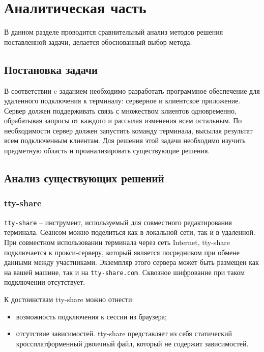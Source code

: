 \chapter{Аналитическая часть}

В данном разделе проводится сравнительный анализ методов решения
поставленной задачи, делается обоснованный выбор метода.

\section{Постановка задачи}

В соответствии c заданием необходимо разработать программное обеспечение для удаленного подключения к терминалу: серверное и клиентское приложение. Сервер должен поддерживать связь с множеством клиентов одновременно, обрабатывая запросы от каждого и рассылая изменения всем остальным. По необходимости сервер должен запустить команду терминала, высылая результат всем подключенным клиентам. Для решения этой задачи необходимо изучить предметную область и проанализировать существующие решения.

\section{Анализ существующих решений}

\subsection{tty-share}

\texttt{tty-share} \cite{tty-share} -- инструмент, используемый для совместного редактирования терминала. Сеансом можно поделиться как в локальной сети, так и в удаленной. При совместном использовании терминала через сеть Internet, tty-share подключается к прокси-серверу, который является посредником при обмене данными между участниками. Экземпляр этого сервера может быть размещен как на вашей машине, так и на \texttt{tty-share.com}. Сквозное шифрование при таком подключении отсутствует.

К достоинствам tty-share можно отнести:
\begin{itemize}
	\item возможность подключения к сессии из браузера;
	\item отсутствие зависимостей. tty-share представляет из себя статический кроссплатформенный двоичный файл, который не содержит зависимостей.
\end{itemize}

